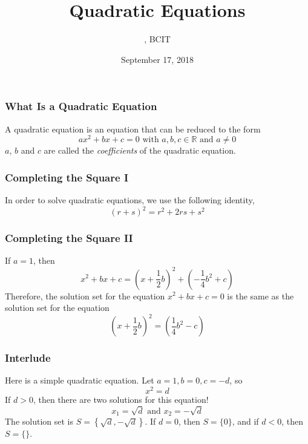 \documentclass[xcolor=dvipsnames]{beamer}
\title{Quadratic Equations}
\subtitle{{\CourseNumber}, BCIT}
\author{\CourseName}
\date{September 17, 2018}
\begin{document}
\begin{frame}
  \titlepage
\end{frame}

\begin{frame}
  \frametitle{What Is a Quadratic Equation}
A quadratic equation is an equation that can be reduced to the form
\begin{equation}
  \label{eq:paezohmu}
  ax^{2}+bx+c=0\mbox{ with }a,b,c\in\mathbb{R}\mbox{ and }a\neq{}0
\end{equation}
$a$, $b$ and $c$ are called the \emph{coefficients} of the quadratic
equation.
\end{frame}

\begin{frame}
  \frametitle{Completing the Square I}
In order to solve quadratic equations, we use the following identity,
\begin{equation}
  \label{eq:uibaifoa}
  (r+s)^{2}=r^{2}+2rs+s^{2}
\end{equation}
\end{frame}

\begin{frame}
  \frametitle{Completing the Square II}
If $a=1$, then
\begin{equation}
  \label{eq:aiphohpi}
  x^{2}+bx+c=\left(x+\frac{1}{2}b\right)^{2}+\left(-\frac{1}{4}b^{2}+c\right)
\end{equation}
Therefore, the solution set for the equation $x^{2}+bx+c=0$ is the
same as the solution set for the equation
\begin{equation}
  \label{eq:diesaisi}
  \left(x+\frac{1}{2}b\right)^{2}=\left(\frac{1}{4}b^{2}-c\right)
\end{equation}
\end{frame}

\begin{frame}
  \frametitle{Interlude}
Here is a simple quadratic equation. Let $a=1,b=0,c=-d$, so
\begin{equation}
  \label{eq:nuphoomu}
  x^{2}=d
\end{equation}
If $d>0$, then there are two solutions for this equation!
\begin{equation}
  \label{eq:gephoopo}
  x_{1}=\sqrt{d}\mbox{ and }x_{2}=-\sqrt{d}
\end{equation}
The solution set is $S=\left\{\sqrt{d},-\sqrt{d}\right\}$. If $d=0$,
then $S=\{0\}$, and if $d<0$, then $S=\{\}$.
\end{frame}
\end{document}
